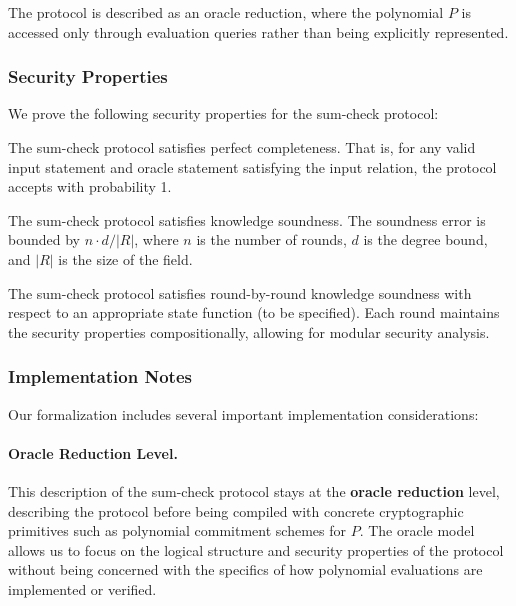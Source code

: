The protocol is described as an oracle reduction, where the polynomial $P$ is accessed only through evaluation queries rather than being explicitly represented.

\subsubsection{Security Properties}

We prove the following security properties for the sum-check protocol:

\begin{theorem}
    \label{thm:sumcheck_perfect_completeness}
    The sum-check protocol satisfies perfect completeness. That is, for any valid input statement and oracle statement satisfying the input relation, the protocol accepts with probability 1.
\end{theorem}

\begin{theorem}
    \label{thm:sumcheck_knowledge_soundness}
    The sum-check protocol satisfies knowledge soundness. The soundness error is bounded by $n \cdot d / |R|$, where $n$ is the number of rounds, $d$ is the degree bound, and $|R|$ is the size of the field.
\end{theorem}

\begin{theorem}
    \label{thm:sumcheck_rbr_knowledge_soundness_standard}
    The sum-check protocol satisfies round-by-round knowledge soundness with respect to an appropriate state function (to be specified). Each round maintains the security properties compositionally, allowing for modular security analysis.
\end{theorem}

\subsubsection{Implementation Notes}

Our formalization includes several important implementation considerations:

\paragraph{Oracle Reduction Level.} This description of the sum-check protocol stays at the \textbf{oracle reduction} level, describing the protocol before being compiled with concrete cryptographic primitives such as polynomial commitment schemes for $P$. The oracle model allows us to focus on the logical structure and security properties of the protocol without being concerned with the specifics of how polynomial evaluations are implemented or verified.

